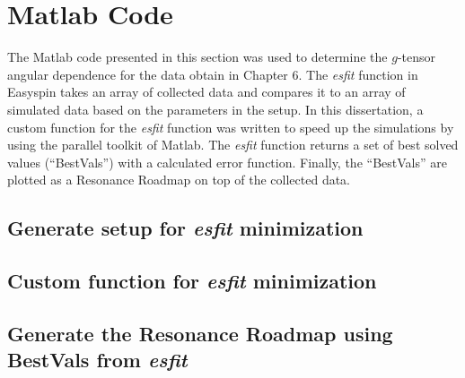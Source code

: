 \chapter[Matlab Code]{Matlab Code}

The Matlab code presented in this section was used to determine the $g$-tensor angular dependence for the data obtain in Chapter 6. The \textit{esfit} function in Easyspin takes an array of collected data and compares it to an array of simulated data based on the parameters in the setup. In this dissertation, a custom function for the \textit{esfit} function was written to speed up the simulations by using the parallel toolkit of Matlab. The \textit{esfit} function returns a set of best solved values (``BestVals'') with a calculated error function. Finally, the ``BestVals'' are plotted as a Resonance Roadmap on top of the collected data.


\section*{Generate setup for {\em esfit} minimization}

\newpage

\section*{Custom function for {\em esfit} minimization}

\newpage


\section*{Generate the Resonance Roadmap using BestVals from {\em esfit}}


